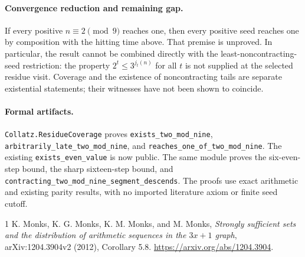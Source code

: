 \documentclass[10pt]{article}
\begin{document}
\paragraph{Convergence reduction and remaining gap.}
If every positive $n\equiv2\pmod9$ reaches one, then every positive seed
reaches one by composition with the hitting time above. That premise is
unproved. In particular, the result cannot be combined directly with the
least-noncontracting-seed restriction: the property
$2^t\leq3^{j_t(n)}$ for all $t$ is not supplied at the selected residue
visit. Coverage and the existence of noncontracting tails are separate
existential statements; their witnesses have not been shown to coincide.

\paragraph{Formal artifacts.}
\texttt{Collatz.ResidueCoverage} proves
\texttt{exists\_two\_mod\_nine},
\texttt{arbitrarily\_late\_two\_mod\_nine}, and
\texttt{reaches\_one\_of\_two\_mod\_nine}.
The existing \texttt{exists\_even\_value} is now public.
The same module proves the six-even-step bound, the sharp sixteen-step
bound, and \texttt{contracting\_two\_mod\_nine\_segment\_descends}.
The proofs use exact arithmetic and existing parity results, with no
imported literature axiom or finite seed cutoff.

\begin{thebibliography}{1}
 K. Monks, K. G. Monks, K. M. Monks, and M. Monks,
\emph{Strongly sufficient sets and the distribution of arithmetic
sequences in the $3x+1$ graph}, arXiv:1204.3904v2 (2012), Corollary 5.8.
\url{https://arxiv.org/abs/1204.3904}.
\end{thebibliography}
\end{document}
